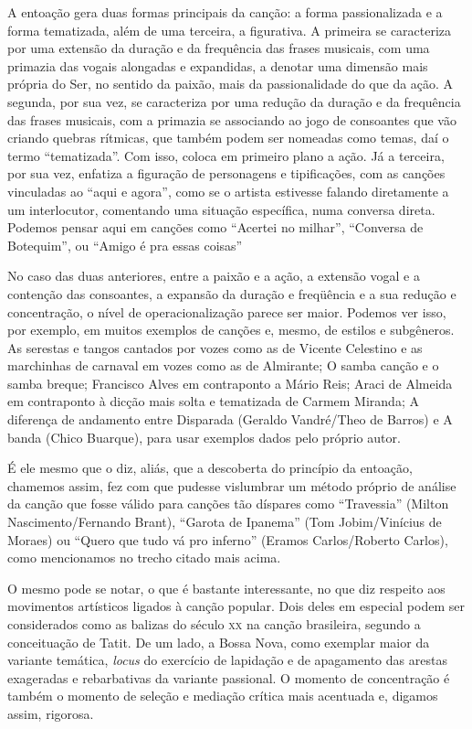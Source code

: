 A entoação gera duas formas principais da canção: a forma passionalizada
e a forma tematizada, além de uma terceira, a figurativa. A primeira se
caracteriza por uma extensão da duração e da frequência das frases
musicais, com uma primazia das vogais alongadas e expandidas, a denotar
uma dimensão mais própria do Ser, no sentido da paixão, mais da
passionalidade do que da ação. A segunda, por sua vez, se caracteriza
por uma redução da duração e da frequência das frases musicais, com a
primazia se associando ao jogo de consoantes que vão criando quebras
rítmicas, que também podem ser nomeadas como temas, daí o termo
``tematizada''. Com isso, coloca em primeiro plano a ação. Já a terceira,
por sua vez, enfatiza a figuração de personagens e tipificações, com as
canções vinculadas ao ``aqui e agora'', como se o artista estivesse
falando diretamente a um interlocutor, comentando uma situação
específica, numa conversa direta. Podemos pensar aqui em canções como
``Acertei no milhar'', ``Conversa de Botequim'', ou ``Amigo é pra essas
coisas''

No caso das duas anteriores, entre a paixão e a ação, a extensão vogal e
a contenção das consoantes, a expansão da duração e freqüência e a sua
redução e concentração, o nível de operacionalização parece ser maior.
Podemos ver isso, por exemplo, em muitos exemplos de canções e, mesmo,
de estilos e subgêneros. As serestas e tangos cantados por vozes como as
de Vicente Celestino e as marchinhas de carnaval em vozes como as de
Almirante; O samba canção e o samba breque; Francisco Alves em
contraponto a Mário Reis; Araci de Almeida em contraponto à dicção mais
solta e tematizada de Carmem Miranda; A diferença de andamento entre
Disparada (Geraldo Vandré/Theo de Barros) e A banda (Chico Buarque),
para usar exemplos dados pelo próprio autor.

É ele mesmo que o diz, aliás, que a descoberta do princípio da entoação,
chamemos assim, fez com que pudesse vislumbrar um método próprio de
análise da canção que fosse válido para canções tão díspares como
``Travessia'' (Milton Nascimento/Fernando Brant), ``Garota de Ipanema''
(Tom Jobim/Vinícius de Moraes) ou ``Quero que tudo vá pro inferno''
(Eramos Carlos/Roberto Carlos), como mencionamos no trecho citado mais
acima.

O mesmo pode se notar, o que é bastante interessante, no que diz
respeito aos movimentos artísticos ligados à canção popular. Dois deles
em especial podem ser considerados como as balizas do século \textsc{xx} na
canção brasileira, segundo a conceituação de Tatit. De um lado, a Bossa
Nova, como exemplar maior da variante temática, \emph{locus} do
exercício de lapidação e de apagamento das arestas exageradas e
rebarbativas da variante passional. O momento de concentração é também o
momento de seleção e mediação crítica mais acentuada e, digamos assim,
rigorosa.

